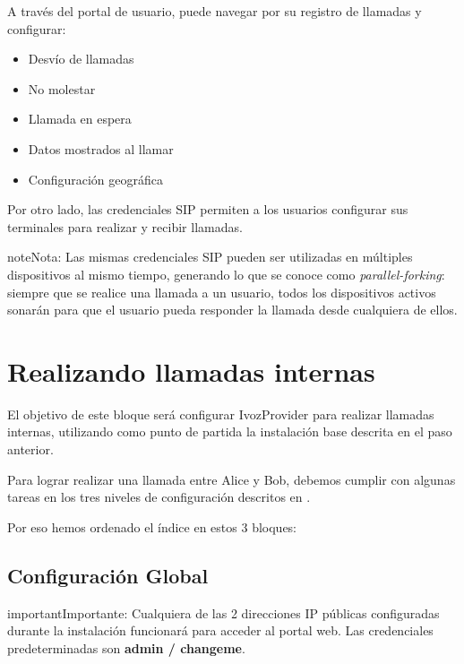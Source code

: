 \documentclass[letterpaper,10pt,spanish]{sphinxmanual}
\begin{document}
A través del portal de usuario, puede navegar por su registro de llamadas y configurar:
\begin{itemize}
\item {} 
Desvío de llamadas

\item {} 
No molestar

\item {} 
Llamada en espera

\item {} 
Datos mostrados al llamar

\item {} 
Configuración geográfica

\end{itemize}

Por otro lado, las credenciales SIP permiten a los usuarios configurar sus terminales para realizar y recibir llamadas.

\begin{notice}{note}{Nota:}
Las mismas credenciales SIP pueden ser utilizadas en múltiples dispositivos al mismo tiempo, generando lo que se conoce como \emph{parallel-forking}: siempre que se realice una llamada a un usuario, todos los dispositivos activos sonarán para que el usuario pueda responder la llamada desde cualquiera de ellos.
\end{notice}


\chapter{Realizando llamadas internas}
\label{getting_started/internal_calls/index:making-internal-calls}\label{getting_started/internal_calls/index::doc}
El objetivo de este bloque será configurar IvozProvider para realizar llamadas internas, utilizando como punto de partida la instalación base descrita en el paso anterior.

Para lograr realizar una llamada entre Alice y Bob, debemos cumplir con algunas tareas en los tres niveles de configuración descritos en {\hyperref[basic_concepts/operation_roles/index:operation\string-roles]{}}.

Por eso hemos ordenado el índice en estos 3 bloques:


\section{Configuración Global}
\label{getting_started/internal_calls/god_portal:global-configuration}\label{getting_started/internal_calls/god_portal::doc}
\begin{notice}{important}{Importante:}
Cualquiera de las 2 direcciones IP públicas configuradas durante la instalación funcionará para acceder al portal web. Las credenciales predeterminadas son \textbf{admin / changeme}.
\end{notice}
\end{document}
